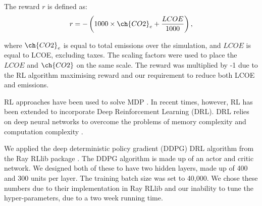 \documentclass{article}
\begin{document}
The reward $r$ is defined as:
\begin{equation}
	r = -\left(1000\times\ch{CO2}_e + \frac{LCOE}{1000}\right),
\end{equation}

where $\ch{CO2}_e$ is equal to total  emissions over the simulation, and $LCOE$ is equal to LCOE, excluding taxes. The scaling factors were used to place the $LCOE$ and $\ch{CO2}$ on the same scale. The reward was multiplied by -1 due to the RL algorithm maximising reward and our requirement to reduce both LCOE and  emissions.


RL approaches have been used to solve MDP \cite{Sutton2015}. In recent times, however, RL has been extended to incorporate Deep Reinforcement Learning (DRL). DRL relies on deep neural networks to overcome the problems of memory complexity and computation complexity \cite{Arulkumaran2017}. 

We applied the deep deterministic policy gradient (DDPG) DRL algorithm \cite{Hunt2016a} from the Ray RLlib package \cite{Liang2014}. The DDPG algorithm is made up of an actor and critic network. We designed both of these to have two hidden layers, made up of 400 and 300 units per layer. The training batch size was set to 40,000. We chose these numbers due to their implementation in Ray RLlib and our inability to tune the hyper-parameters, due to a two week running time.





%
\end{document}
